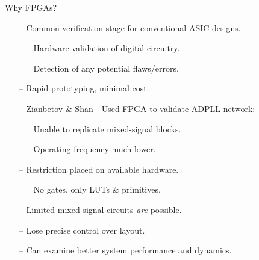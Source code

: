 \documentclass{beamer}
\begin{document}
\begin{frame}{Why FPGAs?}

    \begin{itemize}
		\item[--]
			Common verification stage for conventional ASIC designs.
			\begin{itemize}
				\item[]
				Hardware validation of digital circuitry.
				\item[]
				Detection of any potential flaws/errors.
			\end{itemize}
		\item[--]
			Rapid prototyping, minimal cost.	
		\item[--]
			Zianbetov \& Shan - Used FPGA to validate ADPLL network:
		\begin{itemize}
			\item[]
				Unable to replicate mixed-signal blocks.
			\item[]
				Operating frequency much lower.
		\end{itemize}
		\item[--]
			Restriction placed on available hardware.
			\begin{itemize}
				\item[]
					No gates, only LUTs \& primitives.
			\end{itemize} 
		\item[--]
			Limited mixed-signal circuits \textit{are} possible.
			\item[--]
			Lose precise control over layout.
		\item[--]
			Can examine better system performance and dynamics.
	
	\end{itemize}
\end{frame}
\end{document}
